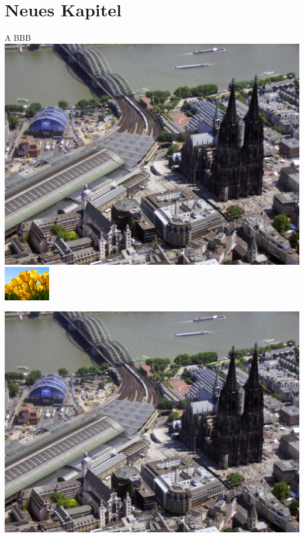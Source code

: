 \documentclass[
    fontsize=11pt,%
    paper=a4,%
    headings=small,
    parskip=half-,
    listof=totoc,
    bibliography=totoc,
    cleardoublepage=empty,
    pagesize
]{scrbook}
\theoremstyle{break}
\theoremstyle{plain}
\begin{document}
\cite[Vgl. dazu auch][17\psq]{Mittelbach.2004}

\hspace*{\fill}
\par

\chapter{Neues Kapitel}
\blindtext

A B\hfill B\hfill B\\
\newlength{\myheight}
\includegraphics[height=\myheight]{Abbildungen/Koeln_RdFlug_1}
\includegraphics[width=2cm]{Abbildungen/Tulips}

\addtolength{\myheight}{3cm}
\includegraphics[height=\myheight]{Abbildungen/Koeln_RdFlug_1}
\end{document}
